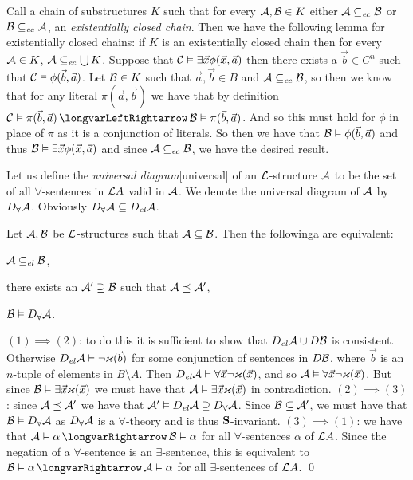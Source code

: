 Call a chain of substructures $K$ such that for every ${\cal A},{\cal B}\in K$ either ${\cal A}\subseteq_{\it ec}{\cal B}$ or ${\cal B}\subseteq_{\it ec}{\cal A}$, an {\it existentially closed chain}.
Then we have the following lemma for existentially closed chains: if $K$ is an existentially closed chain then for every ${\cal A}\in K$, ${\cal A}\subseteq_{\it ec}\bigcup K$.
Suppose that ${\cal C}\vDash\exists\vec x\phi(\vec x,\vec a)$ then there exists a $\vec b\in C^n$ such that ${\cal C}\vDash\phi(\vec b,\vec a)$.
Let ${\cal B}\in K$ such that $\vec a,\vec b\in B$ and ${\cal A}\subseteq_{\it ec}{\cal B}$, so then we know that for any literal $\pi(\vec a,\vec b)$ we have that by definition
${\cal C}\vDash\pi(\vec b,\vec a)\iff{\cal B}\vDash\pi(\vec b,\vec a)$.
And so this must hold for $\phi$ in place of $\pi$ as it is a conjunction of literals.
So then we have that ${\cal B}\vDash\phi(\vec b,\vec a)$ and thus ${\cal B}\vDash\exists\vec x\phi(\vec x,\vec a)$ and since ${\cal A}\subseteq_{\it ec}{\cal B}$, we have the desired result.

Let us define the {\it universal diagram}[universal] of an ${\cal L}$-structure ${\cal A}$ to be the set of all $\forall$-sentences in ${\cal L}A$ valid in ${\cal A}$.
We denote the universal diagram of ${\cal A}$ by $D_\forall{\cal A}$.
Obviously $D_\forall{\cal A}\subseteq D_{\it el}{\cal A}$.

\blemm

    Let ${\cal A},{\cal B}$ be ${\cal L}$-structures such that ${\cal A}\subseteq{\cal B}$.
    Then the followinga are equivalent:
    \benum
        \item ${\cal A}\subseteq_{\it el}{\cal B}$,
        \item there exists an ${\cal A}'\supseteq{\cal B}$ such that ${\cal A}\preceq{\cal A}'$,
        \item ${\cal B}\vDash D_\forall{\cal A}$.
    \eenum

\elemm

$(1)\implies(2)$: to do this it is sufficient to show that $D_{\it el}{\cal A}\cup D{\cal B}$ is consistent.
Otherwise $D_{\it el}{\cal A}\vdash\neg\varkappa(\vec b)$ for some conjunction of sentences in $D{\cal B}$, where $\vec b$ is an $n$-tuple of elements in $B\setminus A$.
Then $D_{\it el}{\cal A}\vdash\forall\vec x\neg\varkappa(\vec x)$, and so ${\cal A}\vDash\forall\vec x\neg\varkappa(\vec x)$.
But since ${\cal B}\vDash\exists\vec x\varkappa(\vec x)$ we must have that ${\cal A}\vDash\exists\vec x\varkappa(\vec x)$ in contradiction.
$(2)\implies(3)$: since ${\cal A}\preceq{\cal A}'$ we have that ${\cal A}'\vDash D_{\it el}{\cal A}\supseteq D_\forall{\cal A}$.
Since ${\cal B}\subseteq{\cal A}'$, we must have that ${\cal B}\vDash D_\forall{\cal A}$ as $D_\forall{\cal A}$ is a $\forall$-theory and is thus ${\bf S}$-invariant.
$(3)\implies(1)$: we have that ${\cal A}\vDash\alpha\implies{\cal B}\vDash\alpha$ for all $\forall$-sentences $\alpha$ of ${\cal L}A$.
Since the negation of a $\forall$-sentence is an $\exists$-sentence, this is equivalent to ${\cal B}\vDash\alpha\implies{\cal A}\vDash\alpha$ for all $\exists$-sentences of ${\cal L}A$.
\qed

